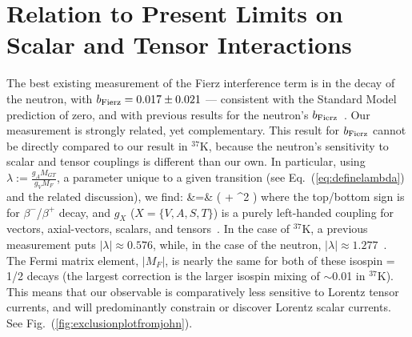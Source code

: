 \section{Relation to Present Limits on Scalar and Tensor Interactions}
\label{sec:scalartensorlimits}
\label{sec:relation_to_other_measurements}
The best existing measurement of the Fierz interference term is in the decay of the neutron, with
\mbox{$b_{\mathrm{Fierz}} = 0.017 \pm 0.021$} --- consistent with the Standard Model prediction of zero, and with previous results for the neutron's $b_{\mathrm{Fierz}}$~\cite{Saul2020}\cite{UCNAfierz2020}. Our measurement is strongly related, yet complementary.  
%
This result for $b_{\mathrm{Fierz}}$ cannot be directly compared to our result in $^{37}$K, because the neutron's sensitivity to scalar and tensor couplings is different than our own.  In particular, using $\lambda := \frac{g_A M_{GT}}{g_V M_F}$, a parameter unique to a given transition (see Eq.~(\ref{eq:definelambda}) and the related discussion), we find:
%
\bea
\bFierz &=&  \left(  + \lambda^2  \right)
\eea
where the top/bottom sign is for $\beta^-$/$\beta^+$ decay, and $g_X$ ($X = \{ V,A,S,T\} $) is a purely left-handed coupling for vectors, axial-vectors, scalars, and tensors~\cite{jtw}\cite{jtw_coulomb}.
In the case of $^{37}$K, a previous measurement puts $ | \lambda | \approx 0.576 $, while, in the case of the neutron, $ | \lambda | \approx 1.277 $~\cite{ben_Abeta}\cite{NeutronAbeta2018}.
The Fermi matrix element, $|M_F|$, is nearly the same for both of these isospin = 1/2 decays (the largest correction is the larger isospin mixing of $\sim$0.01 in $^{37}$K).
This means that our observable is comparatively less sensitive to Lorentz tensor currents, and will predominantly constrain or discover Lorentz scalar currents.  See Fig.~(\ref{fig:exclusionplotfromjohn}).

